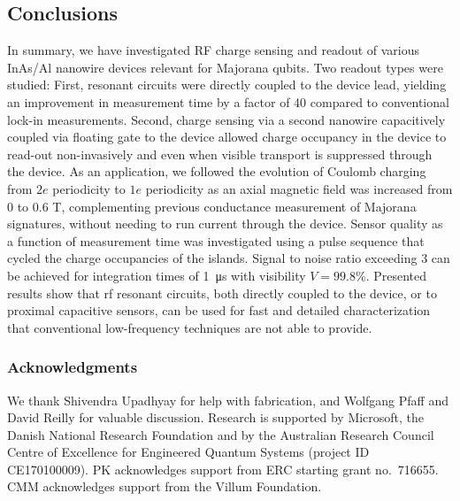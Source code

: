 \subsection{Conclusions}

In summary, we have investigated RF charge sensing and readout of various InAs/Al nanowire devices relevant for Majorana qubits. Two readout types were studied: First, resonant circuits were directly coupled to the device lead, yielding an improvement in measurement time by a factor of 40 compared to conventional lock-in measurements. Second, charge sensing via a second nanowire capacitively coupled via floating gate to the device allowed charge occupancy in the device to read-out non-invasively and even when visible transport is suppressed through the device. As an application, we followed the evolution of Coulomb charging from $2e$ periodicity to $1e$ periodicity as an axial magnetic field was increased from 0 to 0.6 T, complementing previous conductance measurement of Majorana signatures, without needing to run current through the device. Sensor quality as a function of measurement time was investigated using a pulse sequence that cycled the charge occupancies of the islands. Signal to noise ratio exceeding 3 can be achieved for integration times of \SI{1}{\micro\second} with visibility $V = 99.8\%$. Presented results show that rf resonant circuits, both directly coupled to the device, or to proximal capacitive sensors, can be used for fast and detailed characterization that conventional low-frequency techniques are not able to provide.

\subsubsection{Acknowledgments}

We thank Shivendra Upadhyay for help with fabrication, and Wolfgang Pfaff and David Reilly for valuable discussion. Research is supported by Microsoft, the Danish National Research Foundation and by the Australian Research Council Centre of Excellence for Engineered Quantum Systems (project ID CE170100009). PK acknowledges support from ERC starting grant no.~716655. CMM acknowledges support from the Villum Foundation.

